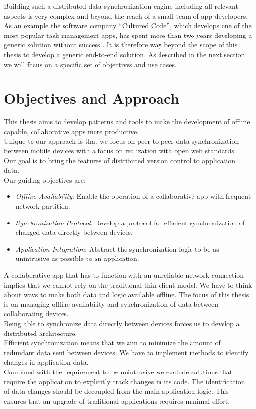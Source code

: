 Building such a distributed data synchronization engine including all relevant aspects is very complex and beyond the reach of a small team of app developers.
As an example the software company ``Cultured Code'', which develops one of the most popular task management apps, has spent more than two years developing a generic solution without success \cite{things}.
It is therefore way beyond the scope of this thesis to develop a generic end-to-end solution.
As described in the next section we will focus on a specific set of objectives and use cases.

\section{Objectives and Approach}

This thesis aims to develop patterns and tools to make the development of offline capable, collaborative apps more productive.\\
Unique to our approach is that we focus on peer-to-peer data synchronization between mobile devices with a focus on realization with open web standards.\\
Our goal is to bring the features of distributed version control to application data.\\

Our guiding objectives are:

\begin{itemize}
\item \emph{Offline Availability}: Enable the operation of a collaborative app with frequent network partition.
\item \emph{Synchronization Protocol}: Develop a protocol for efficient synchronization of changed data directly between devices.
\item \emph{Application Integration}: Abstract the synchronization logic to be as unintrusive as possible to an application.
\end{itemize}

A collaborative app that has to function with an unreliable network connection implies that we cannot rely on the traditional thin client model.
We have to think about ways to make both data and logic available offline.
The focus of this thesis is on managing offline availability and synchronization of data between collaborating devices.\\
Being able to synchronize data directly between devices forces us to develop a distributed architecture.\\
Efficient synchronization means that we aim to minimize the amount of redundant data sent between devices.
We have to implement methods to identify changes in application data.\\
Combined with the requirement to be unintrusive we exclude solutions that require the application to explicitly track changes in its code.
The identification of data changes should be decoupled from the main application logic.
This ensures that an upgrade of traditional applications requires minimal effort.\\

